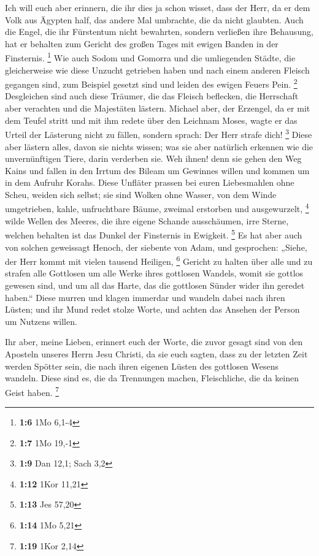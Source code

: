  Ich will euch aber erinnern, die ihr dies ja schon wisset,
dass der Herr, da er dem Volk aus Ägypten half, das andere Mal
umbrachte, die da nicht glaubten.  Auch die Engel, die ihr
Fürstentum nicht bewahrten, sondern verließen ihre Behausung, hat er
behalten zum Gericht des großen Tages mit ewigen Banden in der
Finsternis. \footnote{\textbf{1:6} 1Mo 6,1-4}  Wie auch
Sodom und Gomorra und die umliegenden Städte, die gleicherweise wie
diese Unzucht getrieben haben und nach einem anderen Fleisch gegangen
sind, zum Beispiel gesetzt sind und leiden des ewigen Feuers Pein.
\footnote{\textbf{1:7} 1Mo 19,-1}  Desgleichen sind auch
diese Träumer, die das Fleisch beflecken, die Herrschaft aber verachten
und die Majestäten lästern.  Michael aber, der Erzengel, da
er mit dem Teufel stritt und mit ihm redete über den Leichnam Moses,
wagte er das Urteil der Lästerung nicht zu fällen, sondern sprach: Der
Herr strafe dich! \footnote{\textbf{1:9} Dan 12,1; Sach 3,2}
 Diese aber lästern alles, davon sie nichts wissen; was sie
aber natürlich erkennen wie die unvernünftigen Tiere, darin verderben
sie.  Weh ihnen! denn sie gehen den Weg Kains und fallen in
den Irrtum des Bileam um Gewinnes willen und kommen um in dem Aufruhr
Korahs.  Diese Unfläter prassen bei euren Liebesmahlen ohne
Scheu, weiden sich selbst; sie sind Wolken ohne Wasser, von dem Winde
umgetrieben, kahle, unfruchtbare Bäume, zweimal erstorben und
ausgewurzelt, \footnote{\textbf{1:12} 1Kor 11,21}  wilde
Wellen des Meeres, die ihre eigene Schande ausschäumen, irre Sterne,
welchen behalten ist das Dunkel der Finsternis in Ewigkeit. \footnote{\textbf{1:13}
  Jes 57,20}  Es hat aber auch von solchen geweissagt
Henoch, der siebente von Adam, und gesprochen: „Siehe, der Herr kommt
mit vielen tausend Heiligen, \footnote{\textbf{1:14} 1Mo 5,21}
 Gericht zu halten über alle und zu strafen alle Gottlosen
um alle Werke ihres gottlosen Wandels, womit sie gottlos gewesen sind,
und um all das Harte, das die gottlosen Sünder wider ihn geredet
haben.``  Diese murren und klagen immerdar und wandeln
dabei nach ihren Lüsten; und ihr Mund redet stolze Worte, und achten das
Ansehen der Person um Nutzens willen.

 Ihr aber, meine Lieben, erinnert euch der Worte, die zuvor
gesagt sind von den Aposteln unseres Herrn Jesu Christi, 
da sie euch sagten, dass zu der letzten Zeit werden Spötter sein, die
nach ihren eigenen Lüsten des gottlosen Wesens wandeln. 
Diese sind es, die da Trennungen machen, Fleischliche, die da keinen
Geist haben. \footnote{\textbf{1:19} 1Kor 2,14}

